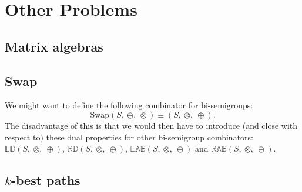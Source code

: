 \documentclass[10pt]{report}
\newcommand{\propname}[1]{{\mathbb{#1}}}
\begin{document}





\chapter{Other Problems} 

\section{Matrix algebras}

\section{Swap}

We might want to define the following combinator for bi-semigroups:
\[ 
\mathrm{Swap}(S,\ \oplus,\ \otimes)   
   \equiv 
   (S,\ \otimes,\ \oplus). 
\] 
The disadvantage of this is that we would then have to introduce 
(and close with respect to) these dual properties for other bi-semigroup combinators: $\propname{LD}(S,\ \otimes,\ \oplus)$, $\propname{RD}(S,\ \otimes,\ \oplus)$, $\propname{LAB}(S,\ \otimes,\ \oplus)$ and $\propname{RAB}(S,\ \otimes,\ \oplus)$.

\section{$k$-best paths}


\end{document}
